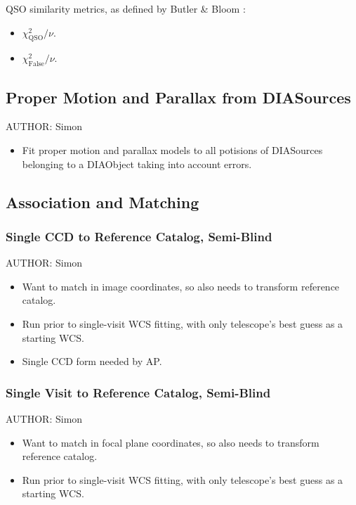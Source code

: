 QSO similarity metrics, as defined by Butler \& Bloom \cite{Butler11}:

\begin{itemize}
\item{$\chi_{\mathrm{QSO}}^2 / \nu$.}
\item{$\chi_{\mathrm{False}}^2 / \nu$.}
\end{itemize}

\subsection{Proper Motion and Parallax from DIASources}
\label{sec:acStellarMotionFitting}
AUTHOR: Simon
\begin{itemize}
\item Fit proper motion and parallax models to all potisions of DIASources belonging to a DIAObject taking into account errors.
\end{itemize}

\subsection{Association and Matching}
\label{sec:acMatching}
\subsubsection{Single CCD to Reference Catalog, Semi-Blind}
\label{sec:acSingleCCDReferenceMatching}
AUTHOR: Simon
\begin{itemize}
\item Want to match in image coordinates, so also needs to transform reference catalog.
\item Run prior to single-visit WCS fitting, with only telescope's best guess as a starting WCS.
\item Single CCD form needed by AP.
\end{itemize}

\subsubsection{Single Visit to Reference Catalog, Semi-Blind}
\label{sec:acSingleVisitReferenceMatching}
AUTHOR: Simon
\begin{itemize}
\item Want to match in focal plane coordinates, so also needs to transform reference catalog.
\item Run prior to single-visit WCS fitting, with only telescope's best guess as a starting WCS.
\end{itemize}

